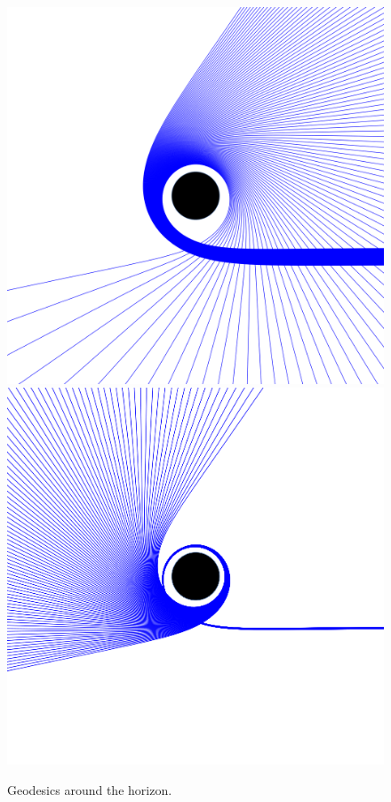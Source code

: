 \begin{figure}[bth]
	\myfloatalign
	 \\
	{\includegraphics[width=.45\linewidth]{gfx/isco1}} \quad
	{\includegraphics[width=.45\linewidth]{gfx/isco2}}
	\caption[Geodesics around the horizon]{Geodesics around the horizon.}
	\label{fig:isco}
\end{figure}